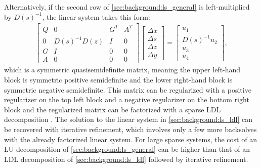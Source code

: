 Alternatively, if the second row of \eqref{sec:background:ls_general} is left-multiplied by $D(s)^{-1}$, the linear system takes this form:
%
\begin{align}
    \begin{bmatrix}
        Q & 0 & G^{T} & A^{T} \\
        0 & D(s)^{-1}D(z) & I & 0 \\
        G & I & 0 & 0 \\
        A & 0 & 0 & 0
    \end{bmatrix}
    \begin{bmatrix}
        \Delta x \\
        \Delta s \\
        \Delta z \\
        \Delta y
    \end{bmatrix}
    = \begin{bmatrix}
        u_1 \\ D(s)^{-1} u_2 \\ u_3 \\ u_4
        \end{bmatrix} \label{sec:background:ls_ldl},
\end{align}
%
which is a symmetric quasisemidefinite matrix, meaning the upper left-hand block is symmetric positive semidefinite and the lower right-hand block is symmetric negative semidefinite. This matrix can be regularized with a positive regularizer on the top left block and a negative regularizer on the bottom right block and the regularized matrix can be factorized with a sparse LDL decomposition \cite{mattingley2012}. The solution to the linear system in \eqref{sec:background:ls_ldl} can be recovered with iterative refinement, which involves only a few more backsolves with the already factorized linear system. For large sparse systems, the cost of an LU decomposition of \eqref{sec:background:ls_general} can be higher than that of an LDL decomposition of \eqref{sec:background:ls_ldl} followed by iterative refinement.
%
